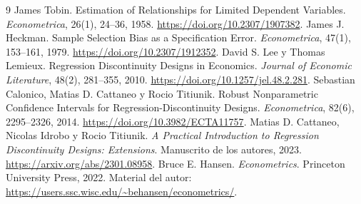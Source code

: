 \documentclass[11pt,a4paper]{article}
\begin{document}
\begin{thebibliography}{9}
James Tobin. Estimation of Relationships for Limited Dependent Variables.
\emph{Econometrica}, 26(1), 24--36, 1958.
\url{https://doi.org/10.2307/1907382}.
James J. Heckman. Sample Selection Bias as a Specification Error.
\emph{Econometrica}, 47(1), 153--161, 1979.
\url{https://doi.org/10.2307/1912352}.
David S. Lee y Thomas Lemieux.
Regression Discontinuity Designs in Economics.
\emph{Journal of Economic Literature}, 48(2), 281--355, 2010.
\url{https://doi.org/10.1257/jel.48.2.281}.
Sebastian Calonico, Matias D. Cattaneo y Rocio Titiunik.
Robust Nonparametric Confidence Intervals for Regression-Discontinuity Designs.
\emph{Econometrica}, 82(6), 2295--2326, 2014.
\url{https://doi.org/10.3982/ECTA11757}.
Matias D. Cattaneo, Nicolas Idrobo y Rocio Titiunik.
\emph{A Practical Introduction to Regression Discontinuity Designs: Extensions}.
Manuscrito de los autores, 2023.
\url{https://arxiv.org/abs/2301.08958}.
Bruce E. Hansen. \emph{Econometrics}.
Princeton University Press, 2022.
Material del autor:
\url{https://users.ssc.wisc.edu/~behansen/econometrics/}.
\end{thebibliography}
\end{document}
